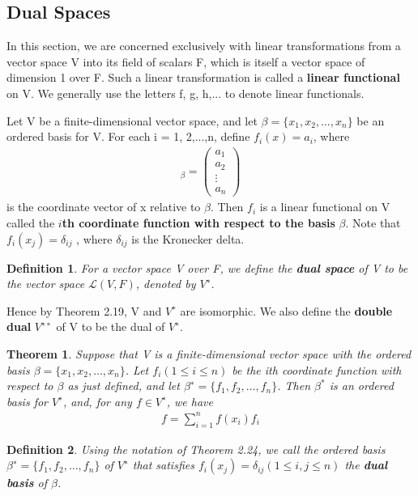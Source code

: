 \documentclass{article}
\newcommand{\bd}[1]{\textbf{#1}}
\newcommand*\bpmat[0]{\begin{pmatrix}}
\newcommand*\epmat[0]{\end{pmatrix}}
\theoremstyle{plain}
\newtheorem{theorem}{Theorem}[section]
\newtheorem*{definition1}{Definition}
\theoremstyle{plain} %
\begin{document}
\subsection {Dual Spaces}

In this section, we are concerned exclusively with linear transformations from a vector space V into its field of scalars F, which is itself a vector space of dimension 1 over F. Such a linear transformation is called a \bd{linear functional} on V. We generally use the letters f, g, h,... to denote linear functionals.

Let V be a finite-dimensional vector space, and let $\beta = \{x_1, x_2,\ldots,x_n\}$ be an ordered basis for V. For each i = 1, 2,...,n, define $f_i(x) = a_i$, where
\begin{align*}
[x]_\beta = \bpmat a_1\\a_2\\ \vdots\\a_n\epmat
\end{align*}
is the coordinate vector of x relative to $\beta$. Then $f_i$ is a linear functional on V called the \bd{$i$th coordinate function with respect to the basis} $\beta$. Note that $f_i(x_j) = \delta_{ij}$ , where $\delta_{ij}$ is the Kronecker delta.

\begin{definition1}
For a vector space V over F, we define the \bd{dual space} of V to be the vector space $\mathcal L(V, F)$, denoted by $V^∗$.
\end{definition1}

Hence by Theorem 2.19, V and $V^∗$ are isomorphic. We also define the \bd{double dual} $V^{∗∗}$ of V to be the dual of $V^∗$.

\begin{theorem}
Suppose that V is a finite-dimensional vector space with the ordered basis $\beta = \{x_1, x_2,\ldots,x_n\}$. Let $f_i (1 \leq  i \leq n)$ be the ith coordinate function with respect to $\beta$ as just defined, and let $\beta^∗ = \{f_1, f_2,\ldots, f_n\}$. Then $\beta^*$ is an ordered basis for $V^∗$, and, for any $f \in V^∗$, we have
\begin{align*}
f=\sum_{i=1}^n f(x_i)f_i
\end{align*}
\end{theorem}

\begin{definition1}
Using the notation of Theorem 2.24, we call the ordered basis $\beta^∗ = \{f_1, f_2,\ldots, f_n\}$ of $V^∗$ that satisfies $f_i(x_j) = \delta_{ij} (1 \leq  i, j \leq n)$ the \bd{dual basis} of $\beta$.
\end{definition1}
\end{document}
